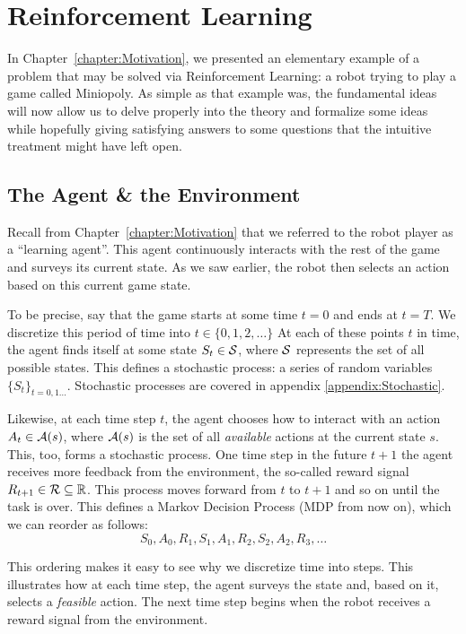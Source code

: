 \chapter{Reinforcement Learning}
\label{chapter:ReinforcementLearning}

In Chapter~\ref{chapter:Motivation}, we presented an elementary example of a
problem that may be solved via Reinforcement Learning: a robot trying to play a
game called Miniopoly. As simple as that example was, the fundamental ideas will
now allow us to delve properly into the theory and formalize some ideas while
hopefully giving satisfying answers to some questions that the intuitive
treatment might have left open.

\section{The Agent \& the Environment} Recall from
Chapter~\ref{chapter:Motivation} that we referred to the robot player as a
``learning agent''. This agent continuously interacts with the rest of the
game and surveys its current state. As we saw earlier, the robot then selects
an action based on this current game state.

To be precise, say that the game starts at some time $t=0$ and ends at $t=T$. We
discretize this period of time into $t \in \{0, 1, 2, \ldots \}$ At each of
these points $t$ in time, the agent finds itself at some state $S_t \in
\mathcal{S}$, where $\mathcal{S}$ represents the set of all possible states. This
defines a stochastic process: a series of random variables $\{ S_t \}_{t = 0, 1
\ldots}$. Stochastic processes are covered in appendix
\ref{appendix:Stochastic}.

Likewise, at each time step $t$, the agent chooses how to interact with an action
$A_t \in \mathcal{A}(s)$, where $\mathcal{A}(s)$ is the set of all \textit{available}
actions at the current state $s$. This, too, forms a stochastic process. One time
step in the future $t+1$ the agent receives more feedback from the environment,
the so-called reward signal $R_{t+1} \in \mathcal{R} \subseteq \mathbb{R}$. This process
moves forward from $t$ to $t+1$ and so on until the task is over. This defines a
Markov Decision Process (MDP from now on), which we can reorder as follows:
\begin{equation}
	\label{eq:mdp-succession}
	S_0, A_0, R_1, S_1, A_1, R_2, S_2, A_2, R_3, \ldots
\end{equation}

This ordering makes it easy to see why we discretize time
into steps. This illustrates how at each time step, the agent surveys the state
and, based on it, selects a \textit{feasible} action. The next time step begins
when the robot receives a reward signal from the environment. 

